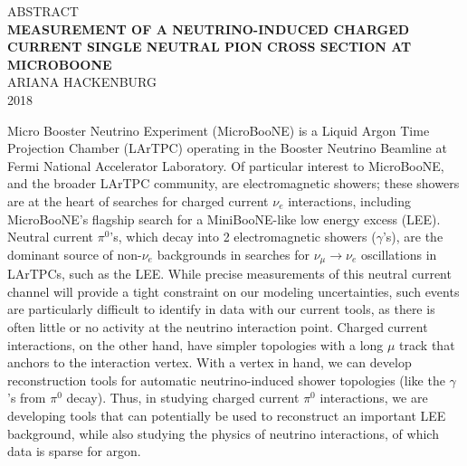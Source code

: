 %

\thispagestyle{empty}
\begin{center}
{\footnotesize ABSTRACT}\\
\vspace{4 mm}
{\large \textbf{MEASUREMENT OF A NEUTRINO-INDUCED CHARGED CURRENT SINGLE NEUTRAL PION CROSS SECTION AT MICROBOONE}}\\
\vspace{6 mm}
{\footnotesize ARIANA HACKENBURG\\
2018\\}
\end{center}

\par
Micro Booster Neutrino Experiment (MicroBooNE) is a Liquid Argon Time Projection Chamber (LArTPC) operating in the Booster Neutrino Beamline at Fermi National Accelerator Laboratory.  Of particular interest to MicroBooNE, and the broader LArTPC community, are electromagnetic showers; these showers are at the heart of searches for charged current $\nu_e$ interactions, including MicroBooNE's flagship search for a MiniBooNE-like low energy excess (LEE).  Neutral current $\pi^0$'s, which decay into 2 electromagnetic showers ($\gamma$'s), are the dominant source of non-$\nu_e$ backgrounds in searches for $\nu_{\mu}\rightarrow\nu_e$ oscillations in LArTPCs, such as the LEE. While precise measurements of this neutral current channel will provide a tight constraint on our modeling uncertainties, such events are particularly difficult to identify in data with our current tools, as there is often little or no activity at the neutrino interaction point. Charged current interactions, on the other hand, have simpler topologies with a long $\mu$ track that anchors to the interaction vertex.  With a vertex in hand, we can develop reconstruction tools for automatic neutrino-induced shower topologies (like the $\gamma$'s from $\pi^0$ decay). Thus, in studying charged current $\pi^0$ interactions, we are developing tools that can potentially be used to reconstruct an important LEE background, while also studying the physics of neutrino interactions, of which data is sparse for argon.

